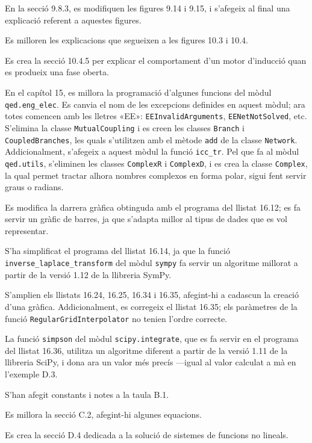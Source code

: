 En la secció 9.8.3, es modifiquen les figures 9.14 i 9.15, i s'afegeix al final una explicació referent a aquestes figures.

Es  milloren les explicacions que segueixen a les figures 10.3 i 10.4.


Es crea la secció 10.4.5 per explicar el comportament d'un motor d'inducció quan es produeix una fase oberta.

En el capítol 15, es millora la programació d'algunes funcions del mòdul  \texttt{qed.eng\_elec}. Es canvia el nom de les excepcions definides en aquest mòdul; ara totes comencen amb les lletres «EE»: \texttt{EEInvalidArguments}, \texttt{EENetNotSolved}, etc. S'elimina la classe \texttt{MutualCoupling} i es creen les classes \texttt{Branch} i \texttt{CoupledBranches}, les quals s'utilitzen amb el mètode \texttt{add} de la classe \texttt{Network}. Addicionalment, s'afegeix a aquest mòdul la funció \texttt{icc\_tr}. Pel que fa al mòdul \texttt{qed.utils}, s'eliminen les classes \texttt{ComplexR} i \texttt{ComplexD}, i es crea la classe \texttt{Complex}, la qual permet tractar alhora nombres complexos en forma polar, sigui fent servir graus o radians.

Es modifica la darrera gràfica obtinguda amb el programa del llistat  16.12; es fa servir un gràfic de barres,  ja que  s'adapta millor al tipus de dades que es vol representar.

S'ha simplificat el programa del llistat 16.14, ja que la funció
\texttt{inverse\_laplace\_transform} del mòdul \texttt{sympy} fa servir un algoritme millorat a partir de la versió 1.12 de la llibreria SymPy.


S'amplien els llistats 16.24, 16.25, 16.34 i 16.35, afegint-hi a cadascun la creació d'una gràfica. Addicionalment, es corregeix el llistat 16.35; els paràmetres de la funció \texttt{RegularGridInterpolator} no tenien l'ordre correcte.


La funció \texttt{simpson} del mòdul \texttt{scipy.integrate}, que es fa servir en el programa del llistat 16.36, utilitza un algoritme diferent  a partir  de la versió 1.11 de la llibreria SciPy, i dona  ara un valor més precís ---igual al valor calculat a mà en l'exemple D.3.


S'han afegit constants i  notes a la taula B.1.

Es millora la secció C.2, afegint-hi algunes equacions.

Es crea la secció D.4 dedicada a la solució de sistemes de funcions  no lineals.

